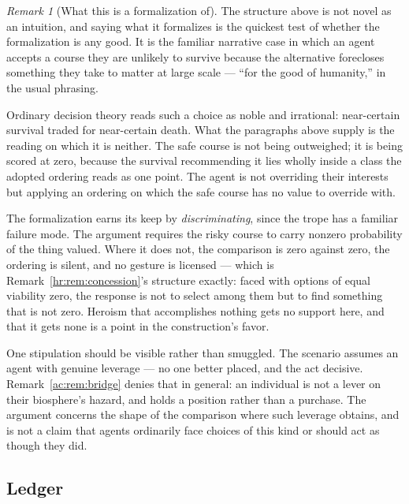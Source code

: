 \documentclass[11pt]{article}
\numberwithin{equation}{section}
\theoremstyle{plain}
\theoremstyle{definition}
\theoremstyle{remark}
\newtheorem{remark}[theorem]{Remark}
\begin{document}
\begin{remark}[What this is a formalization of]\label{gs:rem:trope}
The structure above is not novel as an intuition, and saying what it
formalizes is the quickest test of whether the formalization is any
good. It is the familiar narrative case in which an agent accepts a
course they are unlikely to survive because the alternative forecloses
something they take to matter at large scale --- ``for the good of
humanity,'' in the usual phrasing.

Ordinary decision theory reads such a choice as noble and irrational:
near-certain survival traded for near-certain death. What the paragraphs
above supply is the reading on which it is neither. The safe course is
not being outweighed; it is being scored at zero, because the survival
recommending it lies wholly inside a class the adopted ordering reads as
one point. The agent is not overriding their interests but applying an
ordering on which the safe course has no value to override with.

The formalization earns its keep by \emph{discriminating}, since the
trope has a familiar failure mode. The argument requires the risky course
to carry nonzero probability of the thing valued. Where it does not, the
comparison is zero against zero, the ordering is silent, and no gesture
is licensed --- which is Remark~\ref{hr:rem:concession}'s structure
exactly: faced with options of equal viability zero, the response is not
to select among them but to find something that is not zero. Heroism
that accomplishes nothing gets no support here, and that it gets none is
a point in the construction's favor.

One stipulation should be visible rather than smuggled. The scenario
assumes an agent with genuine leverage --- no one better placed, and the
act decisive. Remark~\ref{ac:rem:bridge} denies that in general: an
individual is not a lever on their biosphere's hazard, and holds a
position rather than a purchase. The argument concerns the shape of the
comparison where such leverage obtains, and is not a claim that agents
ordinarily face choices of this kind or should act as though they did.
\end{remark}

\subsection{Ledger}\label{gs:sub:ledger}
\end{document}
